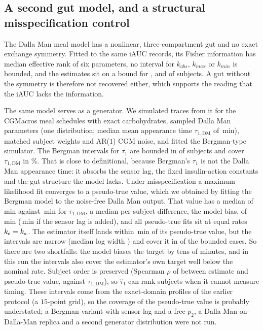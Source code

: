 

\subsection{A second gut model, and a structural misspecification control}
\label{sec:dm}

The Dalla Man meal model \citep{dallaman2007} has a nonlinear, three-compartment gut and no exact exchange symmetry.
Fitted to the same iAUC records, its Fisher information has median effective rank \resDmRankMedian{} of six parameters, no interval for $k_{abs}$, $k_{max}$ or $k_{min}$ is bounded, and the estimates sit on a bound for \resDmPinnedKabs, \resDmPinnedKmax{} and \resDmPinnedKmin{} of \resDmN{} subjects.
A gut without the symmetry is therefore not recovered either, which supports the reading that the iAUC lacks the information.

The same model serves as a generator.
We simulated traces from it for the \resMisspecN{} CGMacros meal schedules with exact carbohydrates, sampled Dalla Man parameters (one distribution; median mean appearance time $\tau_{1,\mathrm{DM}}$ of \resMisspecTrueTauMed{}\,min), matched subject weights and AR($1$) CGM noise, and fitted the Bergman-type simulator.
The Bergman intervals for $\tau_1$ are bounded in \resMisspecTauBd{} of \resMisspecN{} subjects and cover $\tau_{1,\mathrm{DM}}$ in \resMisspecCovDm\%.
That is close to definitional, because Bergman's $\tau_1$ is not the Dalla Man appearance time: it absorbs the sensor lag, the fixed insulin-action constants and the gut structure the model lacks.
Under misspecification a maximum-likelihood fit converges to a pseudo-true value, which we obtained by fitting the Bergman model to the noise-free Dalla Man output.
That value has a median of \resPtMedianPseudo{}\,min against \resPtMedianDm{}\,min for $\tau_{1,\mathrm{DM}}$, a median per-subject difference, the model bias, of \resPtBias{}\,min (\resPtBiasTd{}\,min if the sensor lag is added), and all \resPtTied{} pseudo-true fits sit at equal rates $k_e=k_a$.
The estimator itself lands within \resPtAbsGap{}\,min of its pseudo-true value, but the intervals are narrow (median log width \resPtWidth) and cover it in \resPtCoversPseudo{} of the \resPtBounded{} bounded cases.
So there are two shortfalls: the model biases the target by tens of minutes, and in this run the intervals also cover the estimator's own target well below the nominal rate.
Subject order is preserved (Spearman $\rho$ of \resPtRhoEstPseudo{} between estimate and pseudo-true value, \resMisspecRhoDm{} against $\tau_{1,\mathrm{DM}}$), so $\hat\tau_1$ can rank subjects when it cannot measure timing.
These intervals come from the exact-domain profiles of the earlier protocol (a $15$-point grid), so the coverage of the pseudo-true value is probably understated; a Bergman variant with sensor lag and a free $p_2$, a Dalla Man-on-Dalla-Man replica and a second generator distribution were not run.
